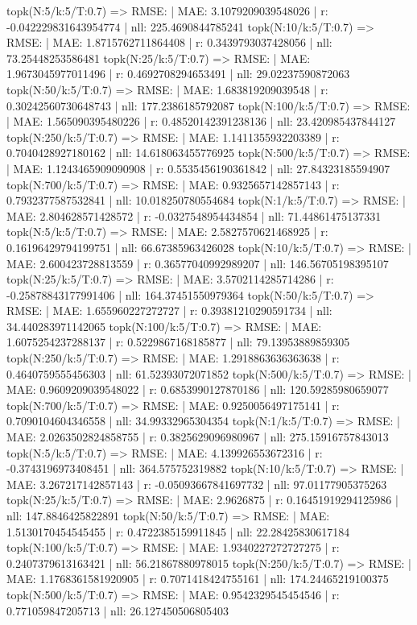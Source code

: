 topk(N:5/k:5/T:0.7) => RMSE: | MAE: 3.1079209039548026 | r: -0.042229831643954774 | nll: 225.4690844785241
topk(N:10/k:5/T:0.7) => RMSE: | MAE: 1.8715762711864408 | r: 0.3439793037428056 | nll: 73.25448253586481
topk(N:25/k:5/T:0.7) => RMSE: | MAE: 1.9673045977011496 | r: 0.4692708294653491 | nll: 29.02237590872063
topk(N:50/k:5/T:0.7) => RMSE: | MAE: 1.683819209039548 | r: 0.30242560730648743 | nll: 177.2386185792087
topk(N:100/k:5/T:0.7) => RMSE: | MAE: 1.565090395480226 | r: 0.48520142391238136 | nll: 23.420985437844127
topk(N:250/k:5/T:0.7) => RMSE: | MAE: 1.1411355932203389 | r: 0.7040428927180162 | nll: 14.618063455776925
topk(N:500/k:5/T:0.7) => RMSE: | MAE: 1.1243465909090908 | r: 0.5535456190361842 | nll: 27.84323185594907
topk(N:700/k:5/T:0.7) => RMSE: | MAE: 0.9325657142857143 | r: 0.7932377587532841 | nll: 10.018250780554684
topk(N:1/k:5/T:0.7) => RMSE: | MAE: 2.804628571428572 | r: -0.0327548954434854 | nll: 71.44861475137331
topk(N:5/k:5/T:0.7) => RMSE: | MAE: 2.5827570621468925 | r: 0.16196429794199751 | nll: 66.67385963426028
topk(N:10/k:5/T:0.7) => RMSE: | MAE: 2.600423728813559 | r: 0.36577040992989207 | nll: 146.56705198395107
topk(N:25/k:5/T:0.7) => RMSE: | MAE: 3.5702114285714286 | r: -0.25878843177991406 | nll: 164.37451550979364
topk(N:50/k:5/T:0.7) => RMSE: | MAE: 1.655960227272727 | r: 0.39381210290591734 | nll: 34.440283971142065
topk(N:100/k:5/T:0.7) => RMSE: | MAE: 1.6075254237288137 | r: 0.5229867168185877 | nll: 79.13953889859305
topk(N:250/k:5/T:0.7) => RMSE: | MAE: 1.2918863636363638 | r: 0.4640759555456303 | nll: 61.52393072071852
topk(N:500/k:5/T:0.7) => RMSE: | MAE: 0.9609209039548022 | r: 0.6853990127870186 | nll: 120.59285980659077
topk(N:700/k:5/T:0.7) => RMSE: | MAE: 0.9250056497175141 | r: 0.7090104604346558 | nll: 34.99332965304354
topk(N:1/k:5/T:0.7) => RMSE: | MAE: 2.0263502824858755 | r: 0.3825629096980967 | nll: 275.15916757843013
topk(N:5/k:5/T:0.7) => RMSE: | MAE: 4.139926553672316 | r: -0.3743196973408451 | nll: 364.575752319882
topk(N:10/k:5/T:0.7) => RMSE: | MAE: 3.267217142857143 | r: -0.05093667841697732 | nll: 97.01177905375263
topk(N:25/k:5/T:0.7) => RMSE: | MAE: 2.9626875 | r: 0.16451919294125986 | nll: 147.8846425822891
topk(N:50/k:5/T:0.7) => RMSE: | MAE: 1.5130170454545455 | r: 0.4722385159911845 | nll: 22.28425830617184
topk(N:100/k:5/T:0.7) => RMSE: | MAE: 1.9340227272727275 | r: 0.2407379613163421 | nll: 56.21867880978015
topk(N:250/k:5/T:0.7) => RMSE: | MAE: 1.1768361581920905 | r: 0.7071418424755161 | nll: 174.24465219100375
topk(N:500/k:5/T:0.7) => RMSE: | MAE: 0.9542329545454546 | r: 0.771059847205713 | nll: 26.127450506805403

